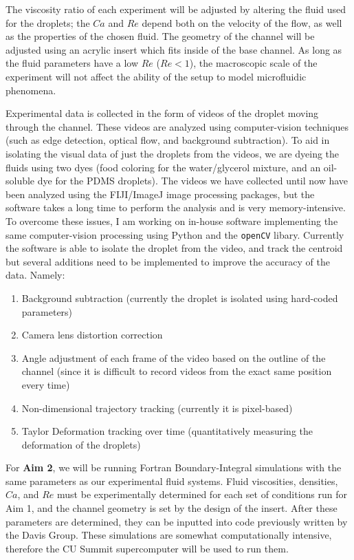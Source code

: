 \documentclass{article}
\begin{document}
The viscosity ratio of each experiment will be adjusted by altering the fluid used for the droplets; the $Ca$ and $Re$ depend both on the velocity of the flow, as well as the properties of the chosen fluid. The geometry of the channel will be adjusted using an acrylic insert which fits inside of the base channel. As long as the fluid parameters have a low $Re$ ($Re < 1$), the macroscopic scale of the experiment will not affect the ability of the setup to model microfluidic phenomena. 

Experimental data is collected in the form of videos of the droplet moving through the channel. These videos are analyzed using computer-vision techniques (such as edge detection, optical flow, and background subtraction). To aid in isolating the visual data of just the droplets from the videos, we are dyeing the fluids using two dyes (food coloring for the water/glycerol mixture, and an oil-soluble dye for the PDMS droplets). The videos we have collected until now have been analyzed using the FIJI/ImageJ image processing packages, but the software takes a long time to perform the analysis and is very memory-intensive. To overcome these issues, I am working on in-house software implementing the same computer-vision processing using Python and the \verb|openCV| libary. Currently the software is able to isolate the droplet from the video, and track the centroid but several additions need to be implemented to improve the accuracy of the data. Namely:
\begin{enumerate}
    \item Background subtraction (currently the droplet is isolated using hard-coded parameters)
    \item Camera lens distortion correction
    \item Angle adjustment of each frame of the video based on the outline of the channel (since it is difficult to record videos from the exact same position every time)
    \item Non-dimensional trajectory tracking (currently it is pixel-based)
    \item Taylor Deformation tracking over time (quantitatively measuring the deformation of the droplets)
\end{enumerate}

For \textbf{Aim 2}, we will be running Fortran Boundary-Integral simulations with the same parameters as our experimental fluid systems. Fluid viscosities, densities, $Ca$, and $Re$ must be experimentally determined for each set of conditions run for Aim 1, and the channel geometry is set by the design of the insert. After these parameters are determined, they can be inputted into code previously written by the Davis Group. These simulations are somewhat computationally intensive, therefore the CU Summit supercomputer will be used to run them. 
\end{document}
